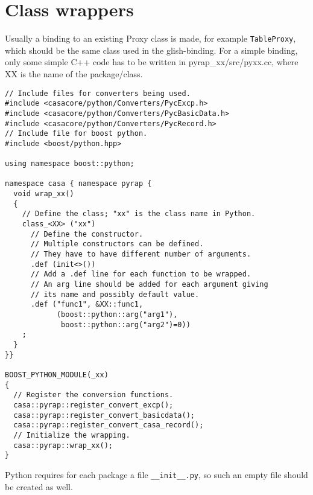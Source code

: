 \section{Class wrappers}
Usually a binding to an existing Proxy class is made, for example
\texttt{TableProxy}, which should be the same class used in the
glish-binding. 
For a simple binding, only some simple C++ code has to be written in
pyrap\_xx/src/pyxx.cc, where XX is the name of the package/class.
\begin{verbatim}
// Include files for converters being used.
#include <casacore/python/Converters/PycExcp.h>
#include <casacore/python/Converters/PycBasicData.h>
#include <casacore/python/Converters/PycRecord.h>
// Include file for boost python.
#include <boost/python.hpp>

using namespace boost::python;

namespace casa { namespace pyrap {
  void wrap_xx()
  {
    // Define the class; "xx" is the class name in Python.
    class_<XX> ("xx")
      // Define the constructor.
      // Multiple constructors can be defined.
      // They have to have different number of arguments.
      .def (init<>())
      // Add a .def line for each function to be wrapped.
      // An arg line should be added for each argument giving
      // its name and possibly default value.
      .def ("func1", &XX::func1,
            (boost::python::arg("arg1"),
             boost::python::arg("arg2")=0))
    ;
  }
}}

BOOST_PYTHON_MODULE(_xx)
{
  // Register the conversion functions.
  casa::pyrap::register_convert_excp();
  casa::pyrap::register_convert_basicdata();
  casa::pyrap::register_convert_casa_record();
  // Initialize the wrapping.
  casa::pyrap::wrap_xx();
}
\end{verbatim}
Python requires for each package a file \texttt{\_\_init\_\_.py},
so such an empty file should be created as well.

